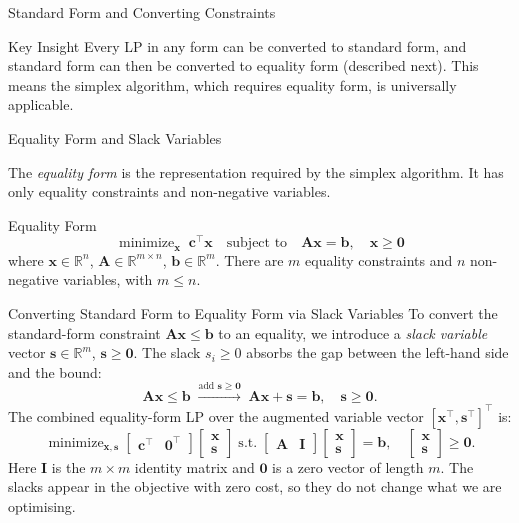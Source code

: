 \documentclass[aspectratio=169,10pt]{beamer}
\DeclareMathOperator*{\minimize}{minimize}
\newcommand{\xv}{\mathbf{x}}
\newcommand{\cv}{\mathbf{c}}
\newcommand{\bv}{\mathbf{b}}
\newcommand{\Av}{\mathbf{A}}
\newcommand{\sv}{\mathbf{s}}
\begin{document}
\begin{frame}[allowframebreaks]{Standard Form and Converting Constraints}
\begin{alertblock}{Key Insight}
Every LP in any form can be converted to standard form, and standard form can then be
converted to equality form (described next).  This means the simplex algorithm, which
requires equality form, is universally applicable.
\end{alertblock}

\end{frame}

\begin{frame}[allowframebreaks]{Equality Form and Slack Variables}

The \emph{equality form} is the representation required by the simplex algorithm.
It has only equality constraints and non-negative variables.

\begin{block}{Equality Form}
\[
  \minimize_{\xv}\;\cv^\top\xv
  \quad\text{subject to}\quad
  \Av\xv = \bv,\quad \xv \ge \mathbf{0}
\]
where $\xv \in \mathbb{R}^n$, $\Av \in \mathbb{R}^{m \times n}$,
$\bv \in \mathbb{R}^m$.  There are $m$ equality constraints and $n$ non-negative
variables, with $m \le n$.
\end{block}

\begin{block}{Converting Standard Form to Equality Form via Slack Variables}
To convert the standard-form constraint $\Av\xv \le \bv$ to an equality, we introduce
a \emph{slack variable} vector $\sv \in \mathbb{R}^m$, $\sv \ge \mathbf{0}$.
The slack $s_i \ge 0$ absorbs the gap between the left-hand side and the bound:
\[
  \Av\xv \le \bv
  \;\xrightarrow{\text{add }\sv\ge\mathbf{0}}\;
  \Av\xv + \sv = \bv,\quad \sv \ge \mathbf{0}.
\]
The combined equality-form LP over the augmented variable vector
$[\xv^\top, \sv^\top]^\top$ is:
\[
  \minimize_{\xv,\sv}
  \begin{bmatrix}\cv^\top & \mathbf{0}^\top\end{bmatrix}
  \begin{bmatrix}\xv\\\sv\end{bmatrix}
  \;\text{s.t.}\;
  \begin{bmatrix}\Av & \mathbf{I}\end{bmatrix}
  \begin{bmatrix}\xv\\\sv\end{bmatrix}
  = \bv,\quad
  \begin{bmatrix}\xv\\\sv\end{bmatrix} \ge \mathbf{0}.
\]
Here $\mathbf{I}$ is the $m \times m$ identity matrix and $\mathbf{0}$ is a zero
vector of length $m$.  The slacks appear in the objective with zero cost, so they do
not change what we are optimising.
\end{block}


\end{frame}
\end{document}
